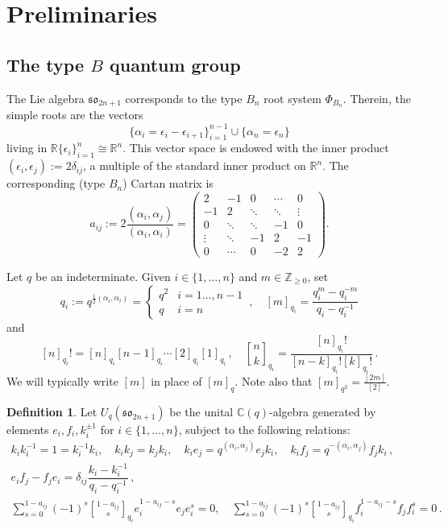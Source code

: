 \documentclass[10pt]{amsart}
\numberwithin{equation}{section}
\theoremstyle{definition}
\newtheorem{defn}[thm]{Definition}
\def\C{{\mathbb C}}
\def\R{{\mathbb R}}
\def\N{\mathbb{Z}_{\ge 0}}%
\newcommand{\son}[1][2n+1]{\mathfrak{so}_{#1}}
\newcommand{\ee}{\alpha}
\begin{document}
%
\section{Preliminaries}
%


\subsection{The type $B$ quantum group}

The Lie algebra $\son$ corresponds to the type $B_n$ root system $\Phi_{B_n}$.
Therein, the simple roots are the vectors
\[
\{\ee_i = \epsilon_i- \epsilon_{i+1} \}_{i=1}^{n-1} \cup \{\ee_n = \epsilon_n\} 
\]
living in $\R\{\epsilon_i\}_{i=1}^n \cong \R^n$. 
This vector space is endowed with the inner product $(\epsilon_i , \epsilon_j) := 2\delta_{ij}$, a multiple
of the standard inner product on $\R^n$.
The corresponding (type $B_n$) Cartan matrix is
\[
a_{ij} := 2 \frac{(\ee_i ,\ee_j)}{(\ee_i , \ee_i)}
=
\begin{pmatrix}
2 & -1 & 0 & \cdots & 0 \\
-1 & 2 & \ddots & \ddots & \vdots \\
0 & \ddots & \ddots & -1 & 0 \\
\vdots & \ddots & -1 & 2 & -1 \\
0 & \cdots & 0 & -2 & 2
\end{pmatrix}.
\]

Let $q$ be an indeterminate.
Given $i \in \{1,\ldots,n\}$ and $m \in \N$, set 
\[
q_i := q^{\frac{1}{2}(\ee_i , \ee_i)} = 
\begin{cases}
q^2 & i = 1 \ldots, n-1 \\
q & i = n
\end{cases} \, , \quad
[m]_{q_i} = \frac{q_i^m- q_i^{-m}}{q_i- q_i^{-1}}
	\]
and
\[
[n]_{q_i}! = [n]_{q_i}[n-1]_{q_i}\cdots[2]_{q_i}[1]_{q_i} \, ,  \quad 
{n \brack k}_{q_i}= \frac{[n]_{q_i}!}{[n-k]_{q_i}![k]_{q_i}!} \, .
\]
We will typically write $[m]$ in place of $[m]_q$.
Note also that $[m]_{q^2} = \tfrac{[2m]}{[2]}$.

\begin{defn}
	\label{def:quantumgroup}
Let $U_q(\son)$ be the unital $\C(q)$-algebra 
generated by elements 
$e_i, f_i, k_i^{\pm 1}$ for $i \in \{1,\ldots,n\}$, subject to the following relations:
\begin{gather*}
k_i k_i^{-1} = 1= k_i^{-1} k_i, \quad k_i k_j = k_j k_i, 
\quad  k_i e_j= q^{(\alpha_i, \alpha_j)} e_j k_i, \quad  k_i f_j = q^{-(\alpha_i, \alpha_j)} f_j k_i \, , \\
e_i f_j - f_je_i = \delta_{ij}\dfrac{k_i- k_i^{-1}}{q_i - q_i^{-1}} \, , \\
\sum_{s= 0}^{1- a_{ij}} (-1)^s{1- a_{ij}\brack s}_{q_i} e_i^{1- a_{ij}- s} e_j e_i^s = 0, 
\quad \sum_{s= 0}^{1- a_{ij}} (-1)^s{1- a_{ij}\brack s}_{q_i} f_i^{1- a_{ij}- s} f_j f_i^s = 0 \, .
	\end{gather*}
\end{defn}
\end{document}
